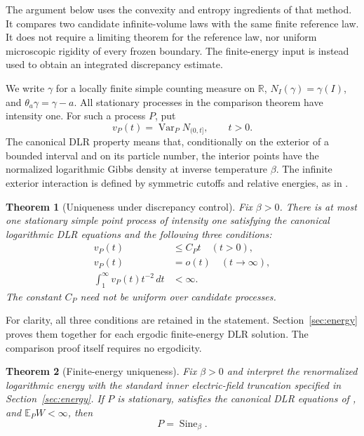 \documentclass[11pt,reqno]{amsart}
\numberwithin{equation}{section}
\newtheorem{theorem}{Theorem}[section]
\theoremstyle{definition}
\theoremstyle{remark}
\newcommand{\R}{\mathbb R}
\newcommand{\E}{\mathbb E}
\newcommand{\1}{\mathbf 1}
\newcommand{\Var}{\operatorname{Var}}
\newcommand{\Sine}{\operatorname{Sine}}
\newcommand{\dd}{\,d}
\begin{document}
The argument below uses the convexity and entropy ingredients of that
method. It compares two candidate infinite-volume laws with the same
finite reference law. It does not require a limiting theorem for the
reference law, nor uniform microscopic rigidity of every frozen boundary.
The finite-energy input is instead used to obtain an integrated
discrepancy estimate.

We write $\gamma$ for a locally finite simple counting measure on $\R$,
$N_I(\gamma)=\gamma(I)$, and $\theta_a\gamma=\gamma-a$. All stationary
processes in the comparison theorem have intensity one. For such a
process $P$, put
\[
v_P(t)=\Var_P N_{(0,t]},\qquad t>0.
\]
The canonical DLR property means that, conditionally on the exterior of a
bounded interval and on its particle number, the interior points have the
normalized logarithmic Gibbs density at inverse temperature $\beta$.
The infinite exterior interaction is defined by symmetric cutoffs and
relative energies, as in \cite[Section~2.1]{DHLM}.

\begin{theorem}[Uniqueness under discrepancy control]\label{thm:comparison}
Fix $\beta>0$. There is at most one stationary simple point process of
intensity one satisfying the canonical logarithmic DLR equations and the
following three conditions:
\begin{align}
v_P(t)&\le C_Pt \quad(t>0),\label{eq:linear}\\
v_P(t)&=o(t)\quad(t\to\infty),\label{eq:hyper}\\
\int_1^\infty v_P(t)t^{-2}\dd t&<\infty.\label{eq:integrated}
\end{align}
The constant $C_P$ need not be uniform over candidate processes.
\end{theorem}

For clarity, all three conditions are retained in the statement.
Section~\ref{sec:energy} proves them together for each ergodic finite-energy
DLR solution. The comparison proof itself requires no ergodicity.

\begin{theorem}[Finite-energy uniqueness]\label{thm:finite-energy}
Fix $\beta>0$ and interpret the renormalized logarithmic energy with the
standard inner electric-field truncation specified in
Section~\ref{sec:energy}. If $P$ is stationary, satisfies the canonical DLR
equations of \cite[Definition~3.1]{DHLM}, and $\E_P W<\infty$, then
\[
P=\Sine_\beta.
\]
\end{theorem}
\end{document}
